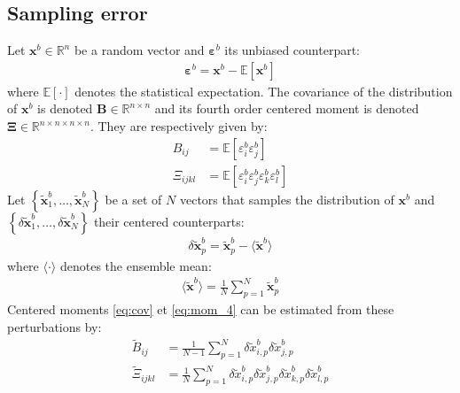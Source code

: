 \documentclass[12pt]{scrartcl}
\begin{document}
\subsection{Sampling error}
Let $\mathbf{x}^b \in \mathbb{R}^n$ be a random vector and $\boldsymbol{\varepsilon}^b$ its unbiased counterpart:
\begin{align}
\boldsymbol{\varepsilon}^b = \mathbf{x}^b - \mathbb{E} \left[\mathbf{x}^b\right]
\end{align}
where $\mathbb{E} [\cdot]$ denotes the statistical expectation. The covariance of the distribution of $\mathbf{x}^b$ is denoted $\mathbf{B} \in \mathbb{R}^{n \times n}$ and its fourth order centered moment is denoted $\boldsymbol{\Xi} \in \mathbb{R}^{n \times n \times n \times n}$. They are respectively given by:
\begin{subequations}
\begin{align}
\label{eq:cov}
B_{ij} & = \mathbb{E}\left[\varepsilon^b_i \varepsilon^b_j\right] \\
\label{eq:mom_4}
\Xi_{ijkl} & = \mathbb{E}\left[\varepsilon^b_i \varepsilon^b_j \varepsilon^b_k \varepsilon^b_l\right]
\end{align}
\end{subequations}
$  $\\
Let $\left\{\widetilde{\mathbf{x}}^b_1,\dots,\widetilde{\mathbf{x}}^b_N\right\}$ be a set of $N$ vectors that samples the distribution of $\mathbf{x}^b$ and $\left\{\delta \widetilde{\mathbf{x}}^b_1,\dots,\delta \widetilde{\mathbf{x}}^b_N\right\}$ their centered counterparts:
\begin{align}
\delta \widetilde{\mathbf{x}}^b_p = \widetilde{\mathbf{x}}^b_p - \langle \widetilde{\mathbf{x}}^b \rangle
\end{align}
where $\langle \cdot \rangle$ denotes the ensemble mean:
\begin{align}
\label{eq:exp_estim}
\langle \widetilde{\mathbf{x}}^b \rangle = \frac{1}{N} \sum_{p=1}^N \widetilde{\mathbf{x}}^b_p
\end{align}
Centered moments \eqref{eq:cov} et \eqref{eq:mom_4} can be estimated from these perturbations by:
\begin{subequations}
\begin{align}
\label{eq:cov_estim}
\widetilde{B}_{ij} & = \frac{1}{N-1} \sum_{p=1}^N \delta \widetilde{x}^b_{i,p} \delta \widetilde{x}^b_{j,p}  \\
\label{eq:mom_4_estim}
\widetilde{\Xi}_{ijkl} & = \frac{1}{N} \sum_{p=1}^N \delta \widetilde{x}^b_{i,p} \delta \widetilde{x}^b_{j,p} \delta \widetilde{x}^b_{k,p} \delta \widetilde{x}^b_{l,p} 
\end{align}
\end{subequations}
\end{document}
